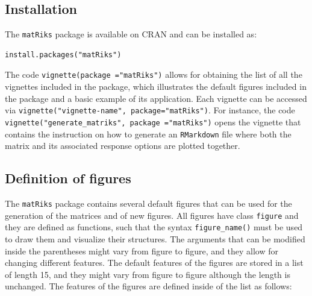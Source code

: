 \subsection{Installation}\label{installation}

The \texttt{matRiks} package is available on CRAN and can be installed as:

\begin{verbatim}
install.packages("matRiks")
\end{verbatim}

The code \texttt{vignette(package\ ="matRiks")} allows for obtaining the list of all the vignettes included in the package, which illustrates the default figures included in the package and a basic example of its application. Each vignette can be accessed via \texttt{vignette("vignette-name",\ package="matRiks")}. For instance, the code \texttt{vignette("generate\_matriks",\ package\ ="matRiks")} opens the vignette that contains the instruction on how to generate an \texttt{RMarkdown} file where both the matrix and its associated response options are plotted together.

\subsection{Definition of figures}\label{definition-of-figures}

The \texttt{matRiks} package contains several default figures that can be used for the generation of the matrices and of new figures.
All figures have class \texttt{figure} and they are defined as functions, such that the syntax \texttt{figure\_name()} must be used to draw them and visualize their structures.
The arguments that can be modified inside the parentheses might vary from figure to figure, and they allow for changing different features.
The default features of the figures are stored in a list of length 15, and they might vary from figure to figure although the length is unchanged. The features of the figures are defined inside of the list as follows:

